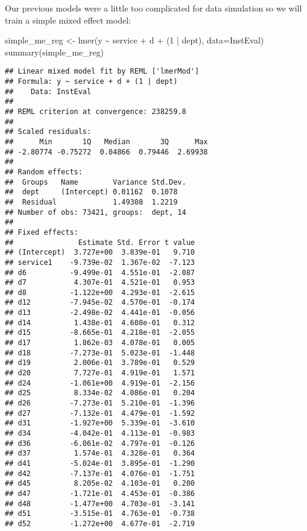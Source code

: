 \documentclass[
]{article}
\newenvironment{Shaded}{\begin{snugshade}}{\end{snugshade}}
\newcommand{\AttributeTok}[1]{\textcolor[rgb]{0.77,0.63,0.00}{#1}}
\newcommand{\DecValTok}[1]{\textcolor[rgb]{0.00,0.00,0.81}{#1}}
\newcommand{\FunctionTok}[1]{\textcolor[rgb]{0.00,0.00,0.00}{#1}}
\newcommand{\NormalTok}[1]{#1}
\newcommand{\OtherTok}[1]{\textcolor[rgb]{0.56,0.35,0.01}{#1}}
\newcommand{\SpecialCharTok}[1]{\textcolor[rgb]{0.00,0.00,0.00}{#1}}
\begin{document}
Our previous models were a little too complicated for data simulation so
we will train a simple mixed effect model:

\begin{Shaded}
\begin{Highlighting}[]
\NormalTok{simple\_me\_reg }\OtherTok{\textless{}{-}} \FunctionTok{lmer}\NormalTok{(y }\SpecialCharTok{\textasciitilde{}}\NormalTok{ service }\SpecialCharTok{+}\NormalTok{ d }\SpecialCharTok{+}\NormalTok{ (}\DecValTok{1} \SpecialCharTok{|}\NormalTok{ dept), }\AttributeTok{data=}\NormalTok{InstEval)}
\FunctionTok{summary}\NormalTok{(simple\_me\_reg)}
\end{Highlighting}
\end{Shaded}

\begin{verbatim}
## Linear mixed model fit by REML ['lmerMod']
## Formula: y ~ service + d + (1 | dept)
##    Data: InstEval
## 
## REML criterion at convergence: 238259.8
## 
## Scaled residuals: 
##      Min       1Q   Median       3Q      Max 
## -2.80774 -0.75272  0.04866  0.79446  2.69938 
## 
## Random effects:
##  Groups   Name        Variance Std.Dev.
##  dept     (Intercept) 0.01162  0.1078  
##  Residual             1.49308  1.2219  
## Number of obs: 73421, groups:  dept, 14
## 
## Fixed effects:
##               Estimate Std. Error t value
## (Intercept)  3.727e+00  3.839e-01   9.710
## service1    -9.739e-02  1.367e-02  -7.123
## d6          -9.499e-01  4.551e-01  -2.087
## d7           4.307e-01  4.521e-01   0.953
## d8          -1.122e+00  4.293e-01  -2.615
## d12         -7.945e-02  4.570e-01  -0.174
## d13         -2.498e-02  4.441e-01  -0.056
## d14          1.438e-01  4.608e-01   0.312
## d15         -8.665e-01  4.218e-01  -2.055
## d17          1.862e-03  4.078e-01   0.005
## d18         -7.273e-01  5.023e-01  -1.448
## d19          2.006e-01  3.789e-01   0.529
## d20          7.727e-01  4.919e-01   1.571
## d24         -1.061e+00  4.919e-01  -2.156
## d25          8.334e-02  4.086e-01   0.204
## d26         -7.273e-01  5.210e-01  -1.396
## d27         -7.132e-01  4.479e-01  -1.592
## d31         -1.927e+00  5.339e-01  -3.610
## d34         -4.042e-01  4.113e-01  -0.983
## d36         -6.061e-02  4.797e-01  -0.126
## d37          1.574e-01  4.328e-01   0.364
## d41         -5.024e-01  3.895e-01  -1.290
## d42         -7.137e-01  4.076e-01  -1.751
## d45          8.205e-02  4.103e-01   0.200
## d47         -1.721e-01  4.453e-01  -0.386
## d48         -1.477e+00  4.703e-01  -3.141
## d51         -3.515e-01  4.763e-01  -0.738
## d52         -1.272e+00  4.677e-01  -2.719

\end{verbatim}
\end{document}

